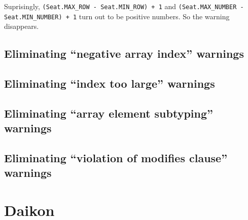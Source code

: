 \documentclass{article}
\begin{document}
Suprisingly, \verb|(Seat.MAX_ROW - Seat.MIN_ROW) + 1| and \verb|(Seat.MAX_NUMBER - Seat.MIN_NUMBER) + 1| turn
out to be positive numbers. So the warning disappears.

\subsection{Eliminating ``negative array index'' warnings}

\subsection{Eliminating ``index too large'' warnings}

\subsection{Eliminating ``array element subtyping'' warnings}

\subsection{Eliminating ``violation of modifies clause'' warnings}

\section{Daikon}
\end{document}
